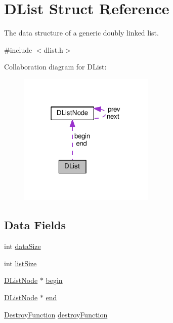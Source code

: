 \hypertarget{struct_d_list}{}\section{D\+List Struct Reference}
\label{struct_d_list}


The data structure of a generic doubly linked list.  




{\ttfamily \#include $<$dlist.\+h$>$}



Collaboration diagram for D\+List\+:
\nopagebreak
\begin{figure}[H]
\begin{center}
\leavevmode
\includegraphics[width=183pt]{struct_d_list__coll__graph}
\end{center}
\end{figure}
\subsection*{Data Fields}
\begin{DoxyCompactItemize}
\item 
int \hyperlink{struct_d_list_a8c8e474bb8d2c6f7162455416b488e50}{data\+Size}
\item 
int \hyperlink{struct_d_list_a91f8b044f23c2395ba7c1ee942b2456c}{list\+Size}
\item 
\hyperlink{struct_d_list_node}{D\+List\+Node} $\ast$ \hyperlink{struct_d_list_a24466a201cee258a771ae5d105cde8c1}{begin}
\item 
\hyperlink{struct_d_list_node}{D\+List\+Node} $\ast$ \hyperlink{struct_d_list_acc55bec99edaf859fc9591ec29b4a46e}{end}
\item 
\hyperlink{dlist_8h_a2206207e78cb6335a8f41ad6cf76b55c}{Destroy\+Function} \hyperlink{struct_d_list_a5b78562613cd563bb5f5dc1cbf721db8}{destroy\+Function}
\end{DoxyCompactItemize}


